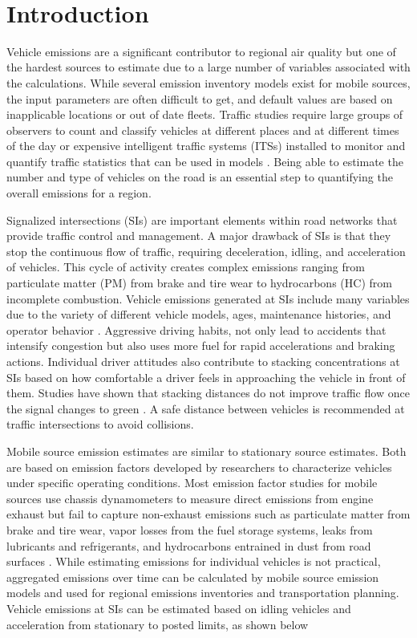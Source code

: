 \documentclass[preprint,12pt,a4paper]{elsarticle}
\begin{document}
\begin{linenumbers}
\begin{frontmatter}
\end{frontmatter}
 
\section{Introduction}

Vehicle emissions are a significant contributor to regional air quality but one of the hardest sources to estimate due to a large number of variables associated with the calculations. While several emission inventory models exist for mobile sources, the input parameters are often difficult to get, and default values are based on inapplicable locations or out of date fleets. Traffic studies require large groups of observers to count and classify vehicles at different places and at different times of the day or expensive intelligent traffic systems (ITSs) installed to monitor and quantify traffic statistics that can be used in models \citep{Suzuki2015}. Being able to estimate the number and type of vehicles on the road is an essential step to quantifying the overall emissions for a region. 

Signalized intersections (SIs) are important elements within road networks that provide traffic control and management. A major drawback of SIs is that they stop the continuous flow of traffic, requiring deceleration, idling, and acceleration of vehicles. This cycle of activity creates complex emissions ranging from particulate matter (PM) from brake and tire wear to hydrocarbons (HC) from incomplete combustion. Vehicle emissions generated at SIs include many variables due to the variety of different vehicle models, ages, maintenance histories, and operator behavior \citep{Freeman2015a, Li2009}. Aggressive driving habits, not only lead to accidents that intensify congestion but also uses more fuel for rapid accelerations and braking actions. Individual driver attitudes also contribute to stacking concentrations at SIs based on how comfortable a driver feels in approaching the vehicle in front of them. Studies have shown that stacking distances do not improve traffic flow once the signal changes to green  \citep{Ahmadi2017}. A safe distance between vehicles is recommended at traffic intersections to avoid collisions.

Mobile source emission estimates are similar to stationary source estimates. Both are based on emission factors developed by researchers to characterize vehicles under specific operating conditions. Most emission factor studies for mobile sources use chassis dynamometers to measure direct emissions from engine exhaust but fail to capture non-exhaust emissions such as particulate matter from brake and tire wear, vapor losses from the fuel storage systems, leaks from lubricants and refrigerants, and hydrocarbons entrained in dust from road surfaces \citep{Kam2012, Franco2013}. While estimating emissions for individual vehicles is not practical, aggregated emissions over time can be calculated by mobile source emission models and used for regional emissions inventories and transportation planning. Vehicle emissions at SIs can be estimated based on idling vehicles and acceleration from stationary to posted limits, as shown below


\end{linenumbers}
\end{document}
